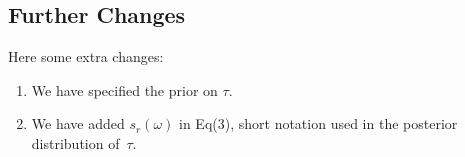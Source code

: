 \documentclass{scrartcl}
\begin{document}
\subsection*{Further Changes}
Here some extra changes:
\begin{enumerate}
	\item We have specified the prior on $\tau$. 
	\item We have added $s_r(\omega)$ in Eq(3), short notation used in the posterior distribution of~$\tau$.	
\end{enumerate}




\end{document}
